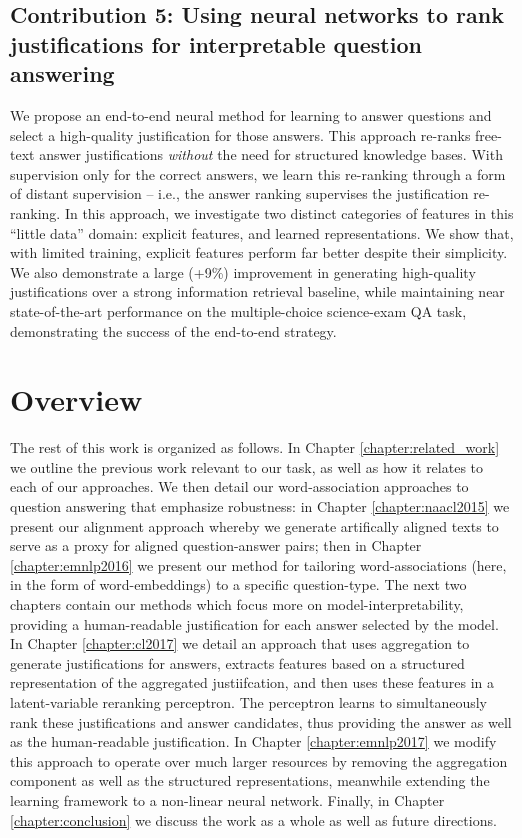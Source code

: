\subsection{Contribution 5: Using neural networks to rank justifications for interpretable question answering} We propose an end-to-end neural method for learning to answer questions and select a high-quality justification for those answers. 
This approach re-ranks free-text answer justifications \emph{without} the need for structured knowledge bases. 
With supervision only for the correct answers, we learn this re-ranking through a form of distant supervision -- i.e., the answer ranking supervises the justification re-ranking. In this approach, we investigate two distinct categories of features in this ``little data'' domain: explicit features, and learned representations. We show that, with limited training, explicit features perform far better despite their simplicity.  We also demonstrate a large (+9\%) improvement in generating high-quality justifications over a strong information retrieval baseline, while maintaining near state-of-the-art performance on the multiple-choice science-exam QA task, demonstrating the success of the end-to-end strategy.




\section{Overview\label{sec:overview}}

The rest of this work is organized as follows.  In Chapter \ref{chapter:related_work} we outline the previous work relevant to our task, as well as how it relates to each of our approaches.  
We then detail our word-association approaches to question answering that emphasize robustness: in Chapter \ref{chapter:naacl2015} we present our alignment approach whereby we generate artifically aligned texts to serve as a proxy for aligned question-answer pairs; then in Chapter \ref{chapter:emnlp2016} we present our method for tailoring word-associations (here, in the form of word-embeddings) to a specific question-type.  The next two chapters contain our methods which focus more on model-interpretability, providing a human-readable justification for each answer selected by the model.  In Chapter \ref{chapter:cl2017} we detail an approach that uses aggregation to generate justifications for answers, extracts features based on a structured representation of the aggregated justiifcation, and then uses these features in a latent-variable reranking perceptron.  The perceptron learns to simultaneously rank these justifications and answer candidates, thus providing the answer as well as the human-readable justification.  In Chapter \ref{chapter:emnlp2017} we modify this approach to operate over much larger resources by removing the aggregation component as well as the structured representations, meanwhile extending the learning framework to a non-linear neural network.  Finally, in Chapter \ref{chapter:conclusion} we discuss the work as a whole as well as future directions.
